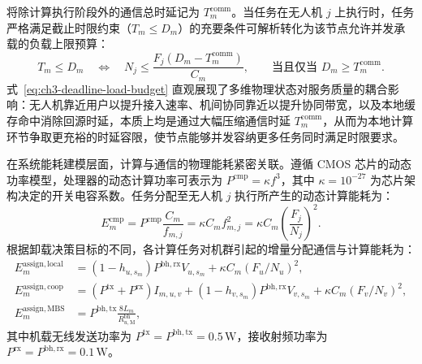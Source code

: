 将除计算执行阶段外的通信总时延记为 $T_m^{\mathrm{comm}}$。当任务在无人机 $j$ 上执行时，任务严格满足截止时限约束（$T_m \leq D_m$）的充要条件可解析转化为该节点允许并发承载的负载上限预算：
\begin{equation}
    T_m \leq D_m \quad \Longleftrightarrow \quad 
    N_j \leq \frac{F_j(D_m - T_m^{\mathrm{comm}})}{C_m}, \qquad \text{当且仅当 } D_m \geq T_m^{\mathrm{comm}}.
    \label{eq:ch3-deadline-load-budget}
\end{equation}
式~\eqref{eq:ch3-deadline-load-budget} 直观展现了多维物理状态对服务质量的耦合影响：无人机靠近用户以提升接入速率、机间协同靠近以提升协同带宽，以及本地缓存命中消除回源时延，本质上均是通过大幅压缩通信时延 $T_m^{\mathrm{comm}}$，从而为本地计算环节争取更充裕的时延容限，使节点能够并发容纳更多任务同时满足时限要求。

在系统能耗建模层面，计算与通信的物理能耗紧密关联。遵循 CMOS 芯片的动态功率模型，处理器的动态计算功率可表示为 $P^{\mathrm{cmp}} = \kappa f^3$，其中 $\kappa=10^{-27}$ 为芯片架构决定的开关电容系数。任务分配至无人机 $j$ 执行所产生的动态计算能耗为：
\begin{equation}
    E_m^{\mathrm{cmp}} = P^{\mathrm{cmp}} \frac{C_m}{f_{m,j}} = \kappa C_m f_{m,j}^2 = \kappa C_m \left(\frac{F_j}{N_j}\right)^2.
    \label{eq:ch3-dynamic-compute-energy}
\end{equation}
根据卸载决策目标的不同，各计算任务对机群引起的增量分配通信与计算能耗为：
\begin{equation}
    \begin{aligned}
    E_m^{\mathrm{assign,local}} &= (1 - h_{u,s_m}) P^{\mathrm{bh,rx}} V_{u,s_m} + \kappa C_m (F_u / N_u)^2,\\
    E_m^{\mathrm{assign,coop}} &= (P^{\mathrm{tx}} + P^{\mathrm{rx}}) I_{m,u,v} + (1 - h_{v,s_m}) P^{\mathrm{bh,rx}} V_{v,s_m} + \kappa C_m (F_v / N_v)^2,\\
    E_m^{\mathrm{assign,MBS}} &= P^{\mathrm{bh,tx}} \frac{8L_m}{R^{\mathrm{bh}}_{u,\mathrm M}},
    \end{aligned}
    \label{eq:ch3-assignment-energy-paths}
\end{equation}
其中机载无线发送功率为 $P^{\mathrm{tx}} = P^{\mathrm{bh,tx}} = 0.5\,\mathrm{W}$，接收射频功率为 $P^{\mathrm{rx}} = P^{\mathrm{bh,rx}} = 0.1\,\mathrm{W}$。

